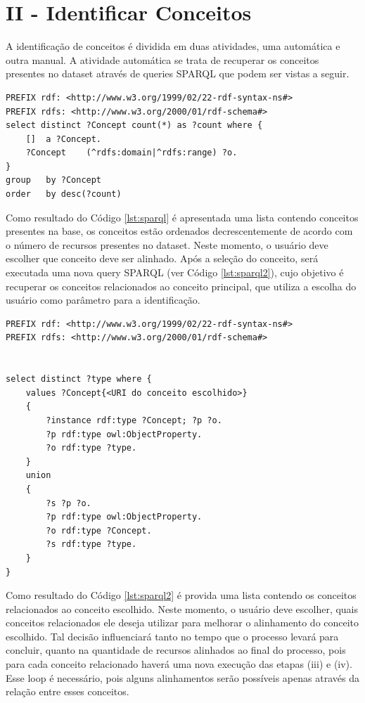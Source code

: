 \section*{II - Identificar Conceitos}
A identificação de conceitos é dividida em duas atividades, uma automática e outra manual. A atividade automática se trata de recuperar os conceitos presentes no dataset através de queries SPARQL que podem ser vistas a seguir.
\\
\begin{lstlisting}[captionpos=b, caption=Query SPARQL para identificação de conceito, label=lst:sparql,
   basicstyle=\ttfamily,frame=single]
PREFIX rdf: <http://www.w3.org/1999/02/22-rdf-syntax-ns#>
PREFIX rdfs: <http://www.w3.org/2000/01/rdf-schema#>
select distinct ?Concept count(*) as ?count where {
	[] 	a ?Concept.
	?Concept 	(^rdfs:domain|^rdfs:range) ?o.
}
group 	by ?Concept	
order 	by desc(?count)
\end{lstlisting}

Como resultado do Código \ref{lst:sparql} é apresentada uma lista contendo conceitos presentes na base, os conceitos estão ordenados decrescentemente de acordo com o número de recursos presentes no dataset. Neste momento, o usuário deve escolher que conceito deve ser alinhado. Após a seleção do conceito, será executada uma nova query SPARQL (ver Código \ref{lst:sparql2}), cujo objetivo é recuperar os conceitos relacionados ao conceito principal, que utiliza a escolha do usuário como parâmetro para a identificação.

\begin{lstlisting}[captionpos=b, caption=Query SPARQL para recuperação de conceitos relacionados, label=lst:sparql2,
   basicstyle=\ttfamily,frame=single]
PREFIX rdf: <http://www.w3.org/1999/02/22-rdf-syntax-ns#>
PREFIX rdfs: <http://www.w3.org/2000/01/rdf-schema#>


select distinct ?type where {
	values ?Concept{<URI do conceito escolhido>}
	{
		?instance rdf:type ?Concept; ?p ?o.
		?p rdf:type owl:ObjectProperty.
		?o rdf:type ?type.
	}
	union
	{
		?s ?p ?o.
		?p rdf:type owl:ObjectProperty.
		?o rdf:type ?Concept.
		?s rdf:type ?type.
	}
}

\end{lstlisting}

Como resultado do Código \ref{lst:sparql2} é provida uma lista contendo os conceitos relacionados ao conceito escolhido. Neste momento, o usuário deve escolher, quais conceitos relacionados ele deseja utilizar para melhorar o alinhamento do conceito escolhido. Tal decisão influenciará tanto no tempo que o processo levará para concluir, quanto na quantidade de recursos alinhados ao final do processo, pois para cada conceito relacionado haverá uma nova execução das etapas (iii) e (iv). Esse loop é necessário, pois alguns alinhamentos serão possíveis apenas através da relação entre esses conceitos.

